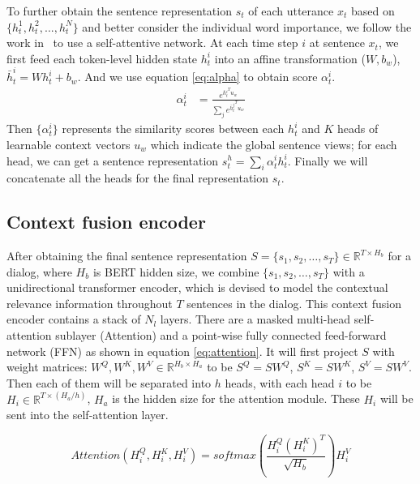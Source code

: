 \documentclass[a4paper]{article}
\begin{document}
To further obtain the sentence representation $s_t$ of each utterance $x_t$ based on $\{h_t^1, h_t^2, ..., h_t^N\}$ and better consider the individual word importance, we follow the work in~\cite{lin2017structured} to use a self-attentive network. At each time step $i$ at sentence $x_t$, we first feed each token-level hidden state $h_t^i$ into an affine transformation ($W, b_w$), $\bar{h}^i_t = W h_t^i + b_w$. And we use equation \ref{eq:alpha} to obtain score $\alpha^i_t$.
\begin{align}
    \alpha^i_t &= \frac{e^{{\bar{h}{^i_t}}^T u_w}}{\sum_{j} e^{{\bar{h}{^j_t}}^T u_w}}
    \label{eq:alpha}
\end{align}
Then $\{\alpha^i_t\}$ represents the similarity scores between each $h_t^i$ and $K$ heads of learnable context vectors $u_w$ which indicate the global sentence views; for each head, we can get a sentence representation $s^h_t = \sum_i \alpha^i_t h^i_t$. Finally we will concatenate all the heads for the final representation $s_t$. 

\subsection{Context fusion encoder}

After obtaining the final sentence representation $S = \{s_1, s_2, \dots, s_T\} \in \mathbb{R}^{T \times H_b}$ for a dialog, where $H_b$ is BERT hidden size, we combine $\{s_1, s_2, \dots, s_T\}$ with a unidirectional transformer encoder, which is devised to model the contextual relevance information throughout $T$ sentences in the dialog. This context fusion encoder contains a stack of $N_l$ layers. There are a masked multi-head self-attention sublayer (Attention) and a point-wise fully connected feed-forward network (FFN) as shown in equation \ref{eq:attention}. It will first project $S$ with weight matrices: $W^Q, W^K, W^V \in \mathbb{R}^{H_b \times H_a}$ to be $S^Q = S W^Q$, $S^K = S W^K$, $S^V = S W^V$. 
Then each of them will be separated into $h$ heads, with each head $i$ to be $H_i \in \mathbb{R}^{T \times (H_a/h)}$, $H_a$ is the hidden size for the attention module. These $H_i$ will be sent into the self-attention layer.

\begin{equation}
    Attention(H^Q_i,H^K_i,H^V_i) = softmax
    (\frac{H^Q_i(H^K_i)^T}{\sqrt{H_b}})H^V_i
\end{equation}
\end{document}
